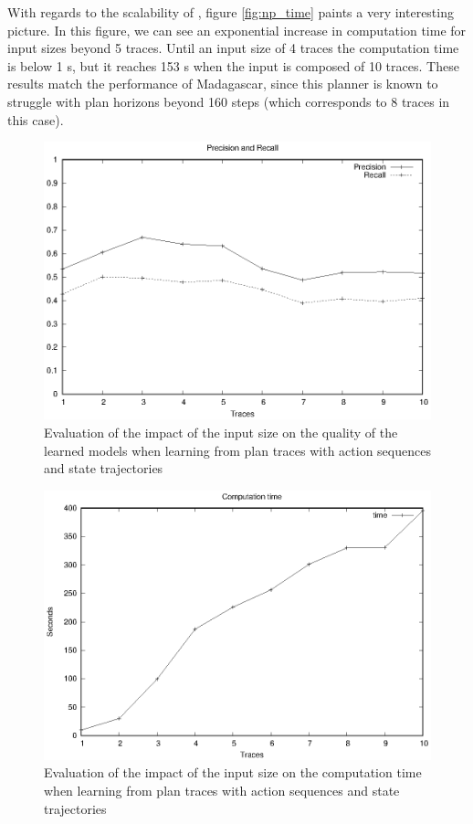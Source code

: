 With regards to the scalability of \FAMA, figure \ref{fig:np_time} paints a very interesting picture. In this figure, we can see an exponential increase in computation time for input sizes beyond 5 traces. Until an input size of 4 traces the computation time is below 1 s, but it reaches 153 s when the input is composed of 10 traces. These results match the performance of {\sc Madagascar}, since this planner is known to struggle with plan horizons beyond 160 steps (which corresponds to 8 traces in this case).


\begin{figure}[hbt!]
	\centering
	\includegraphics[width=0.8\linewidth]{figures/input_size_0_0_precision.eps}
	\caption{Evaluation of the impact of the input size on the quality of the learned models when learning from plan traces with \NO action sequences and \NO state trajectories}
	\label{fig:pspace_quality}
\end{figure}

\begin{figure}[hbt!]
	\centering
	\includegraphics[width=0.8\linewidth]{figures/input_size_0_0_time.eps}
	\caption{Evaluation of the impact of the input size on the computation time when learning from plan traces with \NO action sequences and \NO state trajectories}
	\label{fig:pspace_time}
\end{figure}

